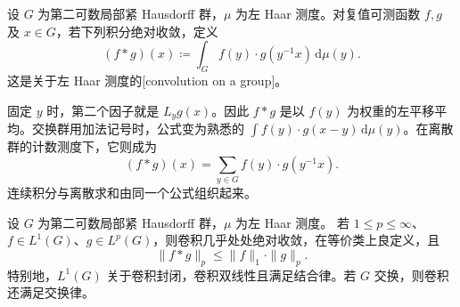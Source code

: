 \begin{definition}[群卷积]
\label{b2:def:I2-convolution}
设 \(G\) 为第二可数局部紧 Hausdorff 群，\(\mu\) 为左 Haar 测度。对复值可测函数 \(f,g\) 及 \(x\in G\)，若下列积分绝对收敛，定义
\[
 (f*g)(x)\coloneqq
 \int_G f(y)\cdot g(y^{-1}x)\,\mathrm d\mu(y).
\]
这是关于左 Haar 测度的[convolution on a group]。
\end{definition}

固定 \(y\) 时，第二个因子就是 \(L_yg(x)\)。因此 \(f*g\) 是以 \(f(y)\) 为权重的左平移平均。交换群用加法记号时，公式变为熟悉的 \(\int f(y)\cdot g(x-y)\,\mathrm d\mu(y)\)。在离散群的计数测度下，它则成为
\[
 (f*g)(x)=\sum_{y\in G}f(y)\cdot g(y^{-1}x).
\]
连续积分与离散求和由同一个公式组织起来。

\begin{theorem}[群卷积的基本估计与结合律]
\label{b2:thm:I2-convolution}
设 \(G\) 为第二可数局部紧 Hausdorff 群，\(\mu\) 为左 Haar 测度。
若 \(1\le p\le\infty\)、\(f\in L^1(G)\)、\(g\in L^p(G)\)，则卷积几乎处处绝对收敛，在等价类上良定义，且
\begin{equation}
\label{b2:eq:I2-left-young}
 \|f*g\|_p\le\|f\|_1\cdot\|g\|_p.
\end{equation}
特别地，\(L^1(G)\) 关于卷积封闭，卷积双线性且满足结合律。若 \(G\) 交换，则卷积还满足交换律。
\end{theorem}
